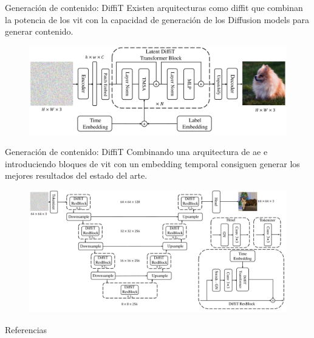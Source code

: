 \begin{frame}{Generación de contenido: DiffiT}
Existen arquitecturas como \alert{\gls{diffit}} \cite{hatamizadeh2024diffit} que combinan la potencia de los \gls{vit} con la capacidad de generación de los \alert{Diffusion models} para generar contenido.

\begin{figure}
    \centering
    \includegraphics[width=\textwidth]{Slides/figures/Vision_Transformers/DiffiT_Architecture.png}
    \caption{\cite{hatamizadeh2024diffit}}
\end{figure}
\end{frame}

\begin{frame}{Generación de contenido: DiffiT}
Combinando una arquitectura de \alert{\gls{ae}} e introduciendo bloques de \gls{vit} con un \alert{embedding temporal} consiguen generar los mejores resultados del estado del arte.

\begin{figure}
    \centering
    \includegraphics[width=\textwidth]{Slides/figures/Vision_Transformers/DiffiT_Transformer.png}
    \caption{\cite{hatamizadeh2024diffit}}
\end{figure}
\end{frame}


\begin{frame}[allowframebreaks]{Referencias}
    
    
\end{frame}

